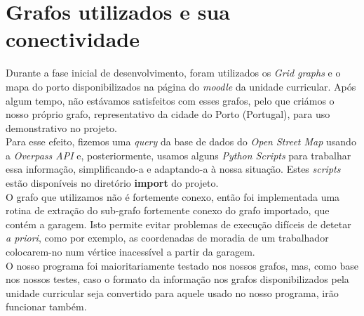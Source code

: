 \documentclass{report}
\begin{document}
\chapter{Grafos utilizados e sua conectividade}
  Durante a fase inicial de desenvolvimento, foram utilizados os \textit{Grid graphs}
  e o mapa do porto disponibilizados na página do \textit{moodle} da unidade curricular.
  Após algum tempo, não estávamos satisfeitos com esses grafos, pelo que criámos o
  nosso próprio grafo, representativo da cidade do Porto (Portugal), para uso
  demonstrativo no projeto.\\
  Para esse efeito, fizemos uma \textit{query} da base de dados do \textit{Open Street
  Map} usando a \textit{Overpass API} e, posteriormente, usamos alguns
  \textit{Python Scripts} para trabalhar essa informação, simplificando-a e adaptando-a
  à nossa situação. Estes \textit{scripts} estão disponíveis no diretório \textbf{import}
  do projeto.\\
  O grafo que utilizamos não é fortemente conexo, então foi implementada uma rotina de
  extração do sub-grafo fortemente conexo do grafo importado, que contém a garagem. Isto
  permite evitar problemas de execução difíceis de detetar \textit{a priori}, como por
  exemplo, as coordenadas de moradia de um trabalhador colocarem-no num vértice inacessível
  a partir da garagem.\\
  O nosso programa foi maioritariamente testado nos nossos grafos, mas, como base nos
  nossos testes, caso o formato da informação nos grafos disponibilizados pela
  unidade curricular seja convertido para aquele usado no nosso programa, irão
  funcionar também.
\end{document}
